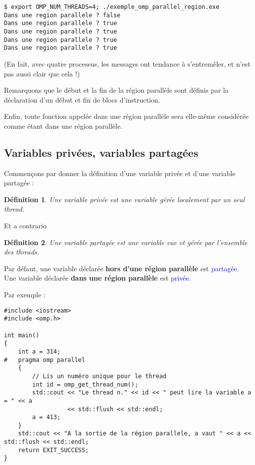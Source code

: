 \documentclass[fleqn,11pt]{article}
\newtheorem{definition}{Définition }
\begin{document}
\begin{verbatim}
$ export OMP_NUM_THREADS=4; ./exemple_omp_parallel_region.exe
Dans une region parallele ? false
Dans une region parallele ? true
Dans une region parallele ? true
Dans une region parallele ? true
Dans une region parallele ? true
\end{verbatim}

(En fait, avec quatre processus, les messages ont tendance à s'entremêler, et n'est pas aussi clair que cela !)

Remarquons que le début et la fin de la région parallèle sont définis par la déclaration d'un début et fin de blocs d'instruction.

Enfin, toute fonction appelée dans une région parallèle sera elle-même considérée comme étant dans une région parallèle.

\subsection{Variables privées, variables partagées}

Commençons par donner la définition d'une variable privée et d'une variable partagée :

\begin{definition}
Une variable privée est une variable gérée localement par un seul thread.
\end{definition}

Et a contrario

\begin{definition}
Une variable partagée est une variable vue et gérée par l'ensemble des threads.
\end{definition}

Par défaut, une variable déclarée \textbf{hors d'une région parallèle} est \textcolor{blue}{partagée}. Une variable déclarée  \textbf{dans une région parallèle} est \textcolor{blue}{privée}.

Par exemple :
\begin{lstlisting}
#include <iostream>
#include <omp.h>

int main()
{
    int a = 314;
#   pragma omp parallel
    {
        // Lis un numéro unique pour le thread
        int id = omp_get_thread_num();
        std::cout << "Le thread n." << id << " peut lire la variable a = " << a 
                  << std::flush << std::endl;
        a = 413;
    }
    std::cout << "A la sortie de la région parallele, a vaut " << a << std::flush << std::endl;
    return EXIT_SUCCESS;
}
\end{lstlisting}
\end{document}
